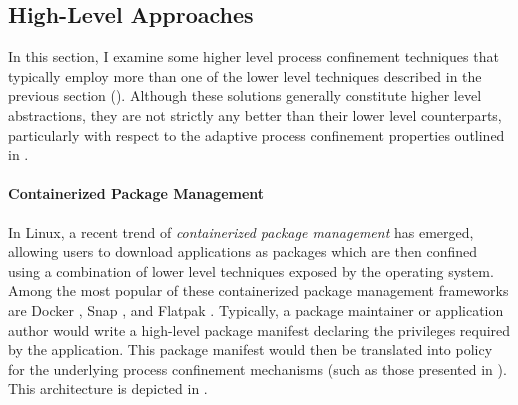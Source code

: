 \documentclass[dvipsnames, 12pt]{article}
\begin{document}

\subsection{High-Level Approaches}
\label{sec:high-level}

In this section, I examine some higher level process confinement techniques that
typically employ more than one of the lower level techniques described in the
previous section (). Although these solutions generally
constitute higher level abstractions, they are not strictly any better than
their lower level counterparts, particularly with respect to the adaptive
process confinement properties outlined in .

\paragraph*{Containerized Package Management}
In Linux, a recent trend of \textit{containerized package management} has
emerged, allowing users to download applications as packages which are then
confined using a combination of lower level techniques exposed by the operating
system. Among the most popular of these containerized package management
frameworks are Docker \cite{docker}, Snap \cite{snap}, and Flatpak
\cite{flatpak}. Typically, a package maintainer or application author would
write a high-level package manifest declaring the privileges required by the
application. This package manifest would then be translated into policy for the
underlying process confinement mechanisms (such as those presented in
). This architecture is depicted in
.
\end{document}
